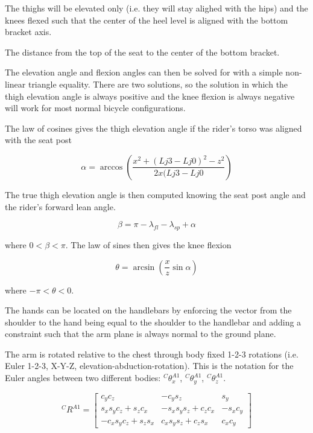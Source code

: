 \documentclass[10pt]{article}
\begin{document}
The thighs will be elevated only (i.e. they will stay alighed with the hips)
and the knees flexed such that the center of the heel level is aligned with the
bottom bracket axis.

The distance from the top of the seat to the center of the bottom bracket.

The elevation angle and flexion angles can then be solved for with a simple
non-linear triangle equality. There are two solutions, so the solution in which
the thigh elevation angle is always positive and the knee flexion is always
negative will work for most normal bicycle configurations.

The law of cosines gives the thigh elevation angle if the rider's torso was
aligned with the seat post

\begin{equation}
	\alpha = \operatorname{arccos}\left(\frac{x^2 + (Lj3 - Lj0)^2 - z^2}{2x(Lj3 -
	Lj0}\right)
\end{equation}

The true thigh elevation angle is then computed knowing the seat post angle and
the rider's forward lean angle.

\begin{equation}
	\beta = \pi - \lambda_{fl} - \lambda_{sp} + \alpha
\end{equation}

where $0<\beta<\pi$. The law of sines then gives the knee flexion

\begin{equation}
	\theta = \operatorname{arcsin}\left(\frac{x}{z} \operatorname{sin}\alpha\right)
\end{equation}

where \(-\pi<\theta<0\).

The hands can be located on the handlebars by enforcing the vector from the
shoulder to the hand being equal to the shoulder to the handlebar and adding
a constraint such that the arm plane is always normal to the ground plane.

The arm is rotated relative to the chest through body fixed 1-2-3 rotations
(i.e. Euler 1-2-3, X-Y-Z, elevation-abduction-rotation). This is the notation
for the Euler angles between two different bodies: \({}^C\theta^{A1}_x\),
\({}^C\theta^{A1}_y\), \({}^C\theta^{A1}_z\).

\begin{equation}
	{}^CR^{A1} =
	\begin{bmatrix}
		c_yc_z & -c_ys_z & s_y\\
		s_xs_yc_z+s_zc_x & -s_xs_ys_z+c_zc_x & -s_xc_y\\
		-c_xs_yc_z+s_zs_x & c_xs_ys_z+c_zs_x & c_xc_y
	\end{bmatrix}
\end{equation}
\end{document}
